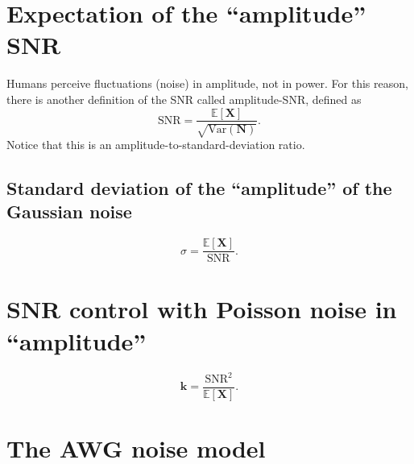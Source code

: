 \section{Expectation of the ``amplitude'' \gls{SNR}}
Humans perceive fluctuations (noise) in amplitude, not in power. For
this reason, there is another definition of the \gls{SNR} called
amplitude-\gls{SNR}, defined as
\begin{equation}
  \text{SNR} = \frac{\mathbb{E}[\bm{X}]}{\sqrt{\text{Var}(\bm{N})}}.
  \label{eq:amplitude_SNR_statistics}
\end{equation}
Notice that this is an amplitude-to-standard-deviation ratio.

\subsection{Standard deviation of the ``amplitude'' of the Gaussian noise}
\begin{equation}
  \sigma = \frac{\mathbb{E}[\bm{X}]}{\text{SNR}}.
\end{equation}

\section{SNR control with Poisson noise in ``amplitude''}
\begin{equation}
  \bm{k} = \frac{\text{SNR}^2}{\mathbb{E}[\bm{X}]}.
\end{equation}

\section{The \acrlong{AWG} noise model} %
\label{sec:AWG}

